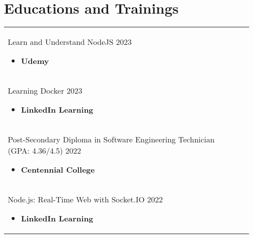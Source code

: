 \documentclass[a4paper,11pt]{article}
\begin{document}
\section{Educations and Trainings}
\begin{tabularx}{\linewidth}{@{}l X@{}}	

    \begin{minipage}[t]{\linewidth}
    Learn and Understand NodeJS  \hfill\normalsize 2023
    
      \begin{itemize}[nosep,after=\strut, leftmargin=1em, itemsep=3pt]
           \item\textbf{\small{Udemy}} 
    \end{itemize}
      
    
    
    \end{minipage} \\[10px]
    
    \begin{minipage}[t]{\linewidth}
    Learning Docker  \hfill\normalsize 2023
    
      \begin{itemize}[nosep,after=\strut, leftmargin=1em, itemsep=3pt]
           \item\textbf{\small{LinkedIn Learning}} 
    \end{itemize}
      
    
    
    \end{minipage} \\[10px]
    
    \begin{minipage}[t]{\linewidth}
    Post-Secondary Diploma in Software Engineering Technician  (GPA: 4.36/4.5) \hfill\normalsize 2022
    
      \begin{itemize}[nosep,after=\strut, leftmargin=1em, itemsep=3pt]
           \item\textbf{\small{Centennial College}} 
    \end{itemize}
      
    
    
    \end{minipage} \\[10px]
    
    \begin{minipage}[t]{\linewidth}
    Node.js: Real-Time Web with Socket.IO  \hfill\normalsize 2022
    
      \begin{itemize}[nosep,after=\strut, leftmargin=1em, itemsep=3pt]
           \item\textbf{\small{LinkedIn Learning}} 
    \end{itemize}
      

\end{minipage}
\end{tabularx}
\end{document}
